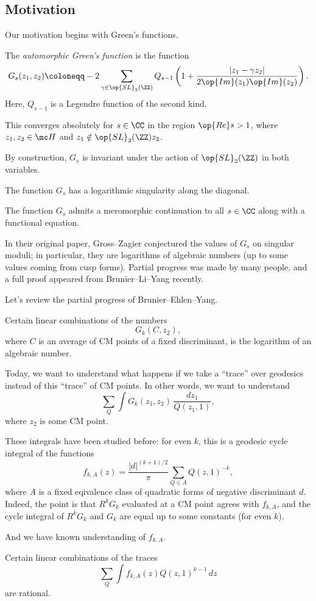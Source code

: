 \documentclass{article}
\begin{document}
\subsection{Motivation}
Our motivation begins with Green's functions.
\begin{definition}
	The \textit{automorphic Green's function} is the function
	\[G_s(z_1,z_2)\coloneqq-2\sum_{\gamma\in\op{SL}_2(\ZZ)}Q_{s-1}\left(1+\frac{\left|z_1-\gamma z_2\right|}{2\op{Im}(z_1)\op{Im}(z_2)}\right).\]
	Here, $Q_{s-1}$ is a Legendre function of the second kind.
\end{definition}
\begin{remark}
	This converges absolutely for $s\in\CC$ in the region $\op{Re}s>1$, where $z_1,z_2\in\mc H$ and $z_1\notin\op{SL}_2(\ZZ)z_2$.
\end{remark}
\begin{remark}
	By construction, $G_s$ is invariant under the action of $\op{SL}_2(\ZZ)$ in both variables.
\end{remark}
\begin{remark}
	The function $G_s$ has a logarithmic singularity along the diagonal.
\end{remark}
\begin{remark}
	The function $G_s$ admits a meromorphic continuation to all $s\in\CC$ along with a functional equation.
\end{remark}
In their original paper, Gross--Zagier conjectured the values of $G_s$ on singular moduli; in particular, they are logarithms of algebraic numbers (up to some values coming from cusp forms). Partial progress was made by many people, and a full proof appeared from Brunier--Li--Yang recently.

Let's review the partial progress of Brunier--Ehlen--Yang.
\begin{theorem}
	Certain linear combinations of the numbers
	\[G_k(C,z_2),\]
	where $C$ is an average of CM points of a fixed discriminant, is the logarithm of an algebraic number.
\end{theorem}
Today, we want to understand what happens if we take a ``trace'' over geodesics instead of this ``trace'' of CM points. In other words, we want to understand
\[\sum_Q\int G_k(z_1,z_2)\,\frac{dz_1}{Q(z_1,1)},\]
where $z_2$ is some CM point.
\begin{remark}
	These integrals have been studied before: for even $k$, this is a geodesic cycle integral of the functions
	\[f_{k,A}(z)=\frac{\left|d\right|^{(k+1)/2}}{\pi}\sum_{Q\in A}Q(z,1)^{-k},\]
	where $A$ is a fixed eqivalence class of quadratic forms of negative discriminant $d$. Indeed, the point is that $R^kG_k$ evaluated at a CM point agrees with $f_{k,A}$, and the cycle integral of $R^kG_k$ and $G_k$ are equal up to some constants (for even $k$).
\end{remark}
And we have known understanding of $f_{k,A}$.
\begin{theorem}
	Certain linear combinations of the traces
	\[\sum_Q\int f_{k,A}(z)Q(z,1)^{k-1}\,dz\]
	are rational.
\end{theorem}
\end{document}
